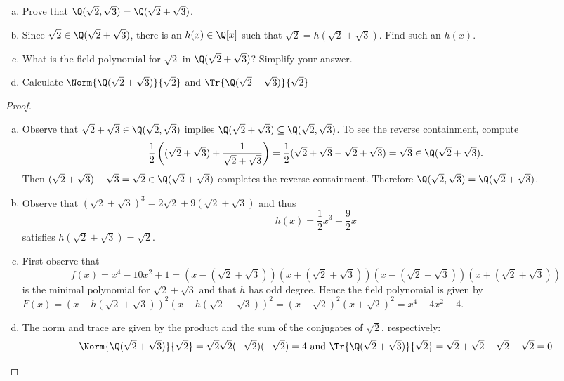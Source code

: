 \documentclass[10pt]{amsart}
\begin{document}
\begin{ex3}
  \begin{enumerate}[(a)]
    \item
      Prove that $\Q(\sqrt{2}, \sqrt{3}) = \Q(\sqrt{2} + \sqrt{3})$.
    \item
      Since $\sqrt{2} \in \Q(\sqrt{2} + \sqrt{3})$, there is an $h(x) \in \Q[x]$ such that $\sqrt{2} = h(\sqrt{2} + \sqrt{3})$.
      Find such an $h(x)$.
    \item
      What is the field polynomial for $\sqrt{2}$ in $\Q(\sqrt{2} + \sqrt{3})$?
      Simplify your answer.
    \item
      Calculate $\Norm{\Q(\sqrt{2} + \sqrt{3})}{\sqrt{2}}$ and $\Tr{\Q(\sqrt{2} + \sqrt{3})}{\sqrt{2}}$
  \end{enumerate}
  \begin{proof}
    \begin{enumerate}[(a)]
    \item
      Observe that $\sqrt{2} + \sqrt{3} \in \Q(\sqrt{2}, \sqrt{3})$ implies $\Q(\sqrt{2} + \sqrt{3}) \subseteq \Q(\sqrt{2}, \sqrt{3})$.
      To see the reverse containment, compute
      $$\frac{1}{2} \left( (\sqrt{2} + \sqrt{3}) + \frac{1}{\sqrt{2} + \sqrt{3}} \right) = \frac{1}{2}(\sqrt{2} + \sqrt{3} - \sqrt{2} + \sqrt{3}) = \sqrt{3} \in \Q(\sqrt{2} + \sqrt{3}).$$
      Then $(\sqrt{2} + \sqrt{3}) - \sqrt{3} = \sqrt{2} \in \Q(\sqrt{2} + \sqrt{3})$ completes the reverse containment.
      Therefore $\Q(\sqrt{2}, \sqrt{3}) = \Q(\sqrt{2} + \sqrt{3})$.
    \item
      Observe that $(\sqrt{2} + \sqrt{3})^3 = 2\sqrt{2} + 9(\sqrt{2} + \sqrt{3})$ and thus
      $$h(x) = \frac{1}{2}x^3 - \frac{9}{2}x$$
      satisfies $h(\sqrt{2} + \sqrt{3}) = \sqrt{2}$.
    \item
      First observe that $$f(x) = x^4 - 10x^2 + 1 = (x - (\sqrt{2} + \sqrt{3}))(x + (\sqrt{2} + \sqrt{3}))(x - (\sqrt{2} - \sqrt{3}))(x + (\sqrt{2} + \sqrt{3}))$$
      is the minimal polynomial for $\sqrt{2} + \sqrt{3}$ and that $h$ has odd degree.
      Hence the field polynomial is given by $F(x) = (x - h(\sqrt{2} + \sqrt{3}))^2(x - h(\sqrt{2} - \sqrt{3}))^2 = (x-\sqrt{2})^2(x + \sqrt{2})^2 = x^4 - 4x^2 + 4$.
    \item
      The norm and trace are given by the product and the sum of the conjugates of $\sqrt{2}$, respectively:
      $$\Norm{\Q(\sqrt{2} + \sqrt{3})}{\sqrt{2}} = \sqrt{2}\sqrt{2}(-\sqrt{2})(-\sqrt{2}) = 4 \text{ and } \Tr{\Q(\sqrt{2} + \sqrt{3})}{\sqrt{2}} = \sqrt{2} + \sqrt{2} - \sqrt{2} - \sqrt{2} = 0$$
    \end{enumerate}
  \end{proof}
\end{ex3}
\end{document}
